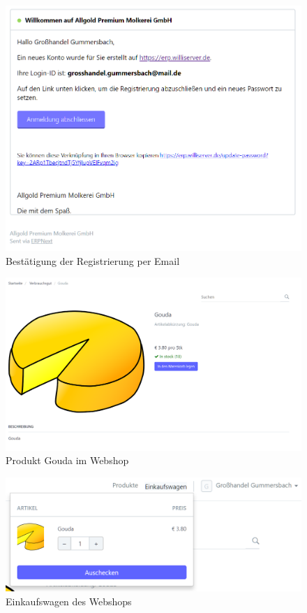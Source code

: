 \begin{figure}[H]
  \centering
  \includegraphics[width=\textwidth]{Bilder/Registrierung_Mail.PNG}
  \caption{Bestätigung der Registrierung per Email}
  \label{fig:regMail}
\end{figure}
\begin{figure}[H]
  \centering
  \includegraphics[width=\textwidth]{Bilder/Webshop_Gouda.PNG}
  \caption{Produkt Gouda im Webshop}
  \label{fig:webGouda}
\end{figure}
\begin{figure}[H]
  \centering
  \includegraphics[width=\textwidth]{Bilder/Einkaufswagen.PNG}
  \caption{Einkaufswagen des Webshops}
  \label{fig:webChart}
\end{figure}
